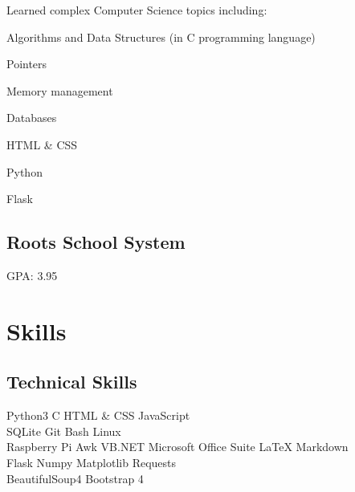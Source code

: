 \documentclass[]{deedy-resume-openfont}
\begin{document}
\begin{minipage}[t]{0.33\textwidth}
    Learned complex Computer Science topics including: \\
    \begin{tightemize}
        \item Algorithms and Data Structures (in C programming language)
        \item Pointers
        \item Memory management
        \item Databases
        \item HTML \& CSS
        \item Python
        \item Flask
    \end{tightemize}
    \sectionsep

    \subsection{Roots School System}
    GPA: 3.95
    \sectionsep


    \section{Skills}
    \subsection{Technical Skills}
    Python3 \textbullet{}   C \textbullet{} HTML \& CSS \textbullet{} JavaScript \\
    SQLite \textbullet{} Git \textbullet{} Bash \textbullet{} Linux \\
    Raspberry Pi \textbullet{} Awk \textbullet{} VB.NET \textbullet{} Microsoft Office Suite \textbullet{} LaTeX \textbullet{} Markdown \\

    Flask \textbullet{} Numpy \textbullet{} Matplotlib \textbullet{} Requests \\ BeautifulSoup4 \textbullet{} Bootstrap 4 \\
    \sectionsep


\end{minipage}
\end{document}
